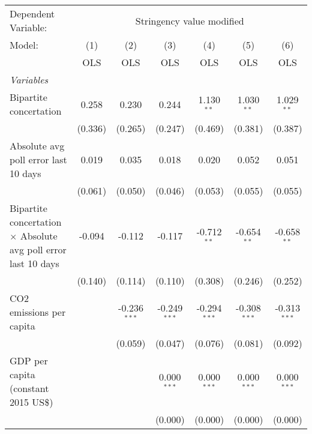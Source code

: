 
\begingroup
\centering
\begin{tabular}{lcccccc}
   \toprule
   Dependent Variable: & \multicolumn{6}{c}{Stringency value modified}\\
   Model:                                                                & (1)     & (2)            & (3)            & (4)            & (5)            & (6)\\  
                                                                         &  OLS    & OLS            & OLS            & OLS            & OLS            & OLS\\  
   \midrule
   \emph{Variables}\\
   Bipartite concertation                                                & 0.258   & 0.230          & 0.244          & 1.130$^{**}$   & 1.030$^{**}$   & 1.029$^{**}$\\   
                                                                         & (0.336) & (0.265)        & (0.247)        & (0.469)        & (0.381)        & (0.387)\\   
   Absolute avg poll error last 10 days                                  & 0.019   & 0.035          & 0.018          & 0.020          & 0.052          & 0.051\\   
                                                                         & (0.061) & (0.050)        & (0.046)        & (0.053)        & (0.055)        & (0.055)\\   
   Bipartite concertation $\times$ Absolute avg poll error last 10 days  & -0.094  & -0.112         & -0.117         & -0.712$^{**}$  & -0.654$^{**}$  & -0.658$^{**}$\\   
                                                                         & (0.140) & (0.114)        & (0.110)        & (0.308)        & (0.246)        & (0.252)\\   
   CO2 emissions per capita                                              &         & -0.236$^{***}$ & -0.249$^{***}$ & -0.294$^{***}$ & -0.308$^{***}$ & -0.313$^{***}$\\   
                                                                         &         & (0.059)        & (0.047)        & (0.076)        & (0.081)        & (0.092)\\   
   GDP per capita (constant 2015 US\$)                                   &         &                & 0.000$^{***}$  & 0.000$^{***}$  & 0.000$^{***}$  & 0.000$^{***}$\\   
                                                                         &         &                & (0.000)        & (0.000)        & (0.000)        & (0.000)\\   

\end{tabular}
